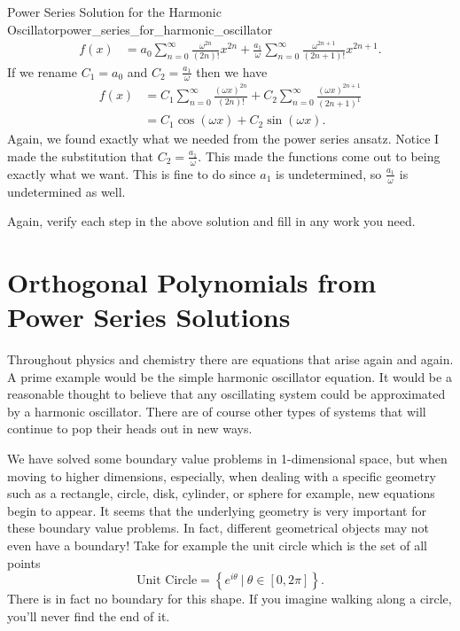 \begin{ex}{Power Series Solution for the Harmonic Oscillator}{power_series_for_harmonic_oscillator}
\begin{align*}
    f(x)&= a_0 \sum_{n=0}^\infty \frac{\omega^{2n}}{(2n)!}x^{2n} + \frac{a_1}{\omega} \sum_{n=0}^\infty \frac{\omega^{2n+1}}{(2n+1)!} x^{2n+1}.
\end{align*}
If we rename $C_1 = a_0$ and $C_2 = \frac{a_1}{\omega}$ then we have
\begin{align*}
    f(x)&=C_1 \sum_{n=0}^\infty \frac{(\omega x)^{2n}}{(2n)!} + C_2 \sum_{n=0}^\infty \frac{(\omega x)^{2n+1}}{(2n+1)^1}\\
    &= C_1 \cos(\omega x)+C_2 \sin(\omega x).
\end{align*}
Again, we found exactly what we needed from the power series ansatz. Notice I made the substitution that $C_2=\frac{a_1}{\omega}$. This made the functions come out to being exactly what we want.  This is fine to do since $a_1$ is undetermined, so $\frac{a_1}{\omega}$ is undetermined as well.
\end{ex}

\begin{exercise}
Again, verify each step in the above solution and fill in any work you need.
\end{exercise}

\section{Orthogonal Polynomials from Power Series Solutions}

Throughout physics and chemistry there are equations that arise again and again.  A prime example would be the simple harmonic oscillator equation.  It would be a reasonable thought to believe that any oscillating system could be approximated by a harmonic oscillator.  There are of course other types of systems that will continue to pop their heads out in new ways.

We have solved some boundary value problems in 1-dimensional space, but when moving to higher dimensions, especially, when dealing with a specific geometry such as a rectangle, circle, disk, cylinder, or sphere for example, new equations begin to appear. It seems that the underlying geometry is very important for these boundary value problems. In fact, different geometrical objects may not even have a boundary! Take for example the unit circle which is the set of all points
\[
\textrm{Unit Circle} = \left\{ e^{i \theta} ~|~ \theta \in [0,2\pi]\right\}.
\]
There is in fact no boundary for this shape. If you imagine walking along a circle, you'll never find the end of it.

